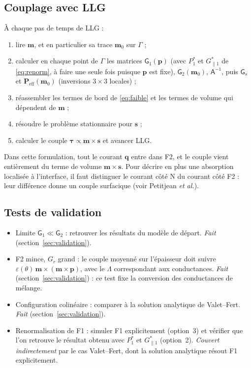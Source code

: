 \documentclass[11pt,a4paper]{article}
\newcommand{\vm}{\bm{m}}
\newcommand{\vp}{\bm{p}}
\newcommand{\vs}{\bm{s}}
\newcommand{\vq}{\bm{q}}
\newcommand{\mG}{\mathsf{G}}
\newcommand{\mA}{\mathsf{A}}
\begin{document}
\subsection{Couplage avec LLG}

À chaque pas de temps de LLG :
\begin{enumerate}
  \item lire $\vm$, et en particulier sa trace $\vm_0$ sur $\Gamma$ ;
  \item calculer en chaque point de $\Gamma$ les matrices
    $\mG_1(\vp)$ (avec $P_1^*$ et $G_{\parallel1}^*$ de
    \eqref{eq:renorm}, à faire une seule fois puisque $\vp$ est fixe),
    $\mG_2(\vm_0)$, $\mA^{-1}$, puis $\mG_s$ et
    $\bm{P}_{\!\mathrm{eff}}(\vm_0)$ (inversions $3\times3$ locales) ;
  \item réassembler les termes de bord de \eqref{eq:faible} et les termes
    de volume qui dépendent de $\vm$ ;
  \item résoudre le problème stationnaire pour $\vs$ ;
  \item calculer le couple $\bm{\tau}\propto\vm\times\vs$ et avancer LLG.
\end{enumerate}
Dans cette formulation, tout le courant $\vq$ entre dans F2, et le couple
vient entièrement du terme de volume $\vm\times\vs$. Pour décrire en plus
une absorption localisée à l'interface, il faut distinguer le courant côté N
du courant côté F2 : leur différence donne un couple surfacique (voir
Petitjean \emph{et al.}).

\subsection{Tests de validation}

\begin{itemize}
  \item Limite $\mG_1\ll\mG_2$ : retrouver les résultats du modèle de
    départ. \emph{Fait} (section~\ref{sec:validation}).
  \item F2 mince, $G_r$ grand : le couple moyenné sur l'épaisseur doit
    suivre $\varepsilon(\theta)\,\vm\times(\vm\times\vp)$, avec le
    $\Lambda$ correspondant aux conductances. \emph{Fait}
    (section~\ref{sec:validation}) : ce test fixe la conversion des
    conductances de mélange.
  \item Configuration colinéaire : comparer à la solution analytique de
    Valet--Fert. \emph{Fait} (section~\ref{sec:validation}).
  \item Renormalisation de F1 : simuler F1 explicitement (option~3) et
    vérifier que l'on retrouve le résultat obtenu avec $P_1^*$ et
    $G_{\parallel1}^*$ (option~2). \emph{Couvert indirectement} par le cas
    Valet--Fert, dont la solution analytique résout F1 explicitement.
\end{itemize}
\end{document}
